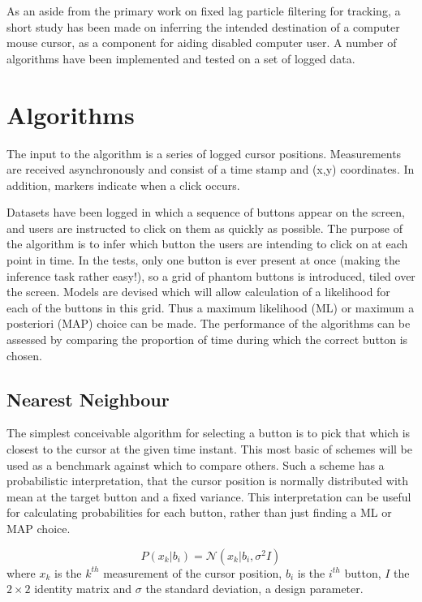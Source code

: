As an aside from the primary work on fixed lag particle filtering for tracking, a short study has been made on inferring the intended destination of a computer mouse cursor, as a component for aiding disabled computer user. A number of algorithms have been implemented and tested on a set of logged data.



\section{Algorithms}
The input to the algorithm is a series of logged cursor positions. Measurements are received asynchronously and consist of a time stamp and (x,y) coordinates. In addition, markers indicate when a click occurs.

Datasets have been logged in which a sequence of buttons appear on the screen, and users are instructed to click on them as quickly as possible. The purpose of the algorithm is to infer which button the users are intending to click on at each point in time. In the tests, only one button is ever present at once (making the inference task rather easy!), so a grid of phantom buttons is introduced, tiled over the screen. Models are devised which will allow calculation of a likelihood for each of the buttons in this grid. Thus a maximum likelihood (ML) or maximum a posteriori (MAP) choice can be made. The performance of the algorithms can be assessed by comparing the proportion of time during which the correct button is chosen.



\subsection{Nearest Neighbour}
The simplest conceivable algorithm for selecting a button is to pick that which is closest to the cursor at the given time instant. This most basic of schemes will be used as a benchmark against which to compare others. Such a scheme has a probabilistic interpretation, that the cursor position is normally distributed with mean at the target button and a fixed variance. This interpretation can be useful for calculating probabilities for each button, rather than just finding a ML or MAP choice.

\begin{equation}P(x_k|b_i) = \mathcal{N}(x_k|b_i, \sigma^2 I)\end{equation}
where $x_k$ is the $k^{th}$ measurement of the cursor position, $b_i$ is the $i^{th}$ button, $I$ the $2 \times 2$ identity matrix and $\sigma$ the standard deviation, a design parameter.

